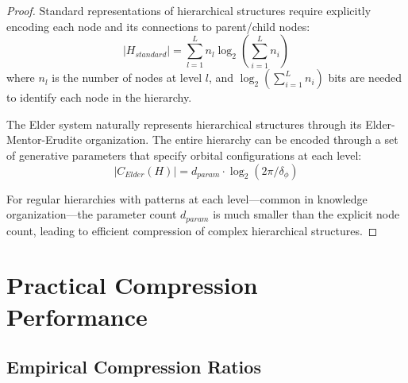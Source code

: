 \begin{proof}
Standard representations of hierarchical structures require explicitly encoding each node and its connections to parent/child nodes:
\begin{equation}
|H_{standard}| = \sum_{l=1}^L n_l \log_2(\sum_{i=1}^L n_i)
\end{equation}
where $n_l$ is the number of nodes at level $l$, and $\log_2(\sum_{i=1}^L n_i)$ bits are needed to identify each node in the hierarchy.

The Elder system naturally represents hierarchical structures through its Elder-Mentor-Erudite organization. The entire hierarchy can be encoded through a set of generative parameters that specify orbital configurations at each level:
\begin{equation}
|C_{Elder}(H)| = d_{param} \cdot \log_2(2\pi/\delta_{\phi})
\end{equation}

For regular hierarchies with patterns at each level—common in knowledge organization—the parameter count $d_{param}$ is much smaller than the explicit node count, leading to efficient compression of complex hierarchical structures.
\end{proof}

\section{Practical Compression Performance}

\subsection{Empirical Compression Ratios}

